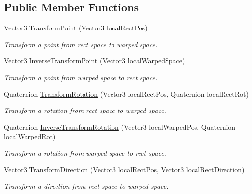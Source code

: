 \subsection*{Public Member Functions}
\begin{DoxyCompactItemize}
\item 
Vector3 \mbox{\hyperlink{class_leap_1_1_unity_1_1_space_1_1_identity_transformer_ab0c7ba8c98e532237b23e6bffb67becd}{Transform\+Point}} (Vector3 local\+Rect\+Pos)
\begin{DoxyCompactList}\small\item\em Transform a point from rect space to warped space. \end{DoxyCompactList}\item 
Vector3 \mbox{\hyperlink{class_leap_1_1_unity_1_1_space_1_1_identity_transformer_a404c960dbb06676aee1e634957349e4b}{Inverse\+Transform\+Point}} (Vector3 local\+Warped\+Space)
\begin{DoxyCompactList}\small\item\em Transform a point from warped space to rect space. \end{DoxyCompactList}\item 
Quaternion \mbox{\hyperlink{class_leap_1_1_unity_1_1_space_1_1_identity_transformer_a299300bfabf6eb706fe3f876ca3384c8}{Transform\+Rotation}} (Vector3 local\+Rect\+Pos, Quaternion local\+Rect\+Rot)
\begin{DoxyCompactList}\small\item\em Transform a rotation from rect space to warped space. \end{DoxyCompactList}\item 
Quaternion \mbox{\hyperlink{class_leap_1_1_unity_1_1_space_1_1_identity_transformer_acd239c878d3c9edba001ed51f4511c1a}{Inverse\+Transform\+Rotation}} (Vector3 local\+Warped\+Pos, Quaternion local\+Warped\+Rot)
\begin{DoxyCompactList}\small\item\em Transform a rotation from warped space to rect space. \end{DoxyCompactList}\item 
Vector3 \mbox{\hyperlink{class_leap_1_1_unity_1_1_space_1_1_identity_transformer_a653673b36d9de3f837033af24b75da49}{Transform\+Direction}} (Vector3 local\+Rect\+Pos, Vector3 local\+Rect\+Direction)
\begin{DoxyCompactList}\small\item\em Transform a direction from rect space to warped space. \end{DoxyCompactList}\item 

\end{DoxyCompactItemize}
